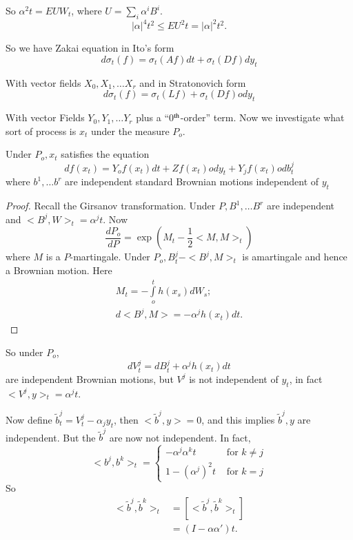 So $\alpha^2 t = E U W_t$, where $U = \sum_i \alpha^i B^i$.
$$
|\alpha|^4 t^2 \leq E U^2 t = |\alpha|^2 t^2.
$$

So we have Zakai equation in Ito's form 
$$
d \sigma_t(f) = \sigma_t(Af) dt + \sigma_t(Df) dy_t
$$

With vector fields $X_0,X_1, \ldots X_r$ and in Stratonovich form 
$$
d \sigma_t(f) = \sigma_t(Lf) + \sigma_t(Df) o dy_t
$$
 
With vector Fields $Y_0,Y_1, \ldots Y_r$ plus a ``0$^{\rm th}$-order''
term. Now we investigate what sort of process is $x_t$ under the
measure $P_o$. 

\begin{prop} %
  Under $P_o, x_t$ satisfies the equation
  \begin{equation*}
    df(x_t) = Y_o f(x_t) dt + Zf(x_t) o dy_t + Y_j f(x_t) o db^j_t
    \tag{17}\label{part2:sec1:eq17} 
  \end{equation*}
  where $b^1, \ldots b^r$ are independent standard Brownian
  motions independent of $y_t$ 
\end{prop}

\begin{proof}
  Recall the Girsanov transformation. Under $P, B^1, \ldots B^r$ are
  independent and $< B^j, W>_t = \alpha^j t$. Now  
  $$
  \frac{dP_o}{dP} = \exp \left(M_t - \frac{1}{2}< M, M>_t\right)
  $$
  where $M$ is a $P$-martingale. Under $P_o, B^j_t - < B^j, M>_t$
  is a\pageoriginale martingale and hence a Brownian motion. Here
  \begin{gather*}
    M_t= - \int \limits^t_o h(x_s) dW_s;\\
    d< B^j, M > = - \alpha ^j h(x_t) dt.
  \end{gather*}
\end{proof}

So under $P_o$,
$$
dV^j_t = dB^j_t + \alpha^j h(x_t) dt
$$
are independent Brownian motions, but $V^j$ is not independent of
$y_t$, in fact $< V^j, y >_t = \alpha^j t$. 

Now define $\tilde{b}^j_t =V^j_t - \alpha_j y_t$, then $< \tilde{b}^j,
y > =0$, and this implies $\tilde{b}^j, y$ are independent. But the
$\tilde{b}^j$ are now not independent. In fact, 
\begin{equation*}
  < b^j, b^k>_t =
  \begin{cases}
    - \alpha^j  \alpha^k t &\text{ for } k \neq j \\
    1- (\alpha^j)^2 t & \text{ for } k = j
  \end{cases}
\end{equation*}
So
\begin{align*}
  < \tilde{b}^j,\tilde{b}^k>_t & = \left[< \tilde{b}^j, \tilde{b}^k
    >_t\right] \\
  & = (I- \alpha \alpha')t.
\end{align*}

